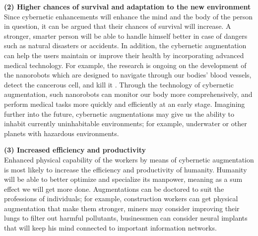 {\bf (2) Higher chances of survival and adaptation to the new environment} \\
Since cybernetic enhancements will enhance the mind and the body of the person in question, it can be argued that their chances of survival will increase. A stronger, smarter person will be able to handle himself better in case of dangers such as natural disasters or accidents. In addition, the cybernetic augmentation can help the users maintain or improve their health by incorporating advanced medical technology. For example, the research is ongoing on the development of the nanorobots which are designed to navigate through our bodies' blood vessels, detect the cancerous cell, and kill it \cite{nanorobot}. Through the technology of cybernetic augmentation, such nanorobots can monitor our body more comprehensively, and perform medical tasks more quickly and efficiently at an early stage. Imagining further into the future, cybernetic augmentations may give us the ability to inhabit currently uninhabitable environments; for example, underwater or other planets with hazardous environments.


{\bf (3) Increased efficiency and productivity}\\
Enhanced physical capability of the workers by means of cybernetic augmentation is most likely to increase the efficiency and productivity of humanity. Humanity will be able to better optimize and specialize its manpower, meaning as a sum effect we will get more done. Augmentations can be doctored to suit the professions of individuals; for example, construction workers can get physical augmentation that make them stronger, miners may consider improving their lungs to filter out harmful pollutants, businessmen can consider neural implants that will keep his mind connected to important information networks.

